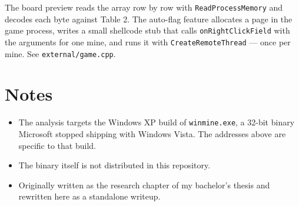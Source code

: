 \documentclass[11pt,a4paper]{article}
\begin{document}
The board preview reads the array row by row with \texttt{ReadProcessMemory} and decodes each
byte against Table 2. The auto-flag feature allocates a page in the game process, writes a small
shellcode stub that calls \texttt{onRightClickField} with the arguments for one mine, and runs
it with \texttt{CreateRemoteThread} --- once per mine. See \texttt{external/game.cpp}.


\section*{Notes}

\begin{itemize}
  \item The analysis targets the Windows XP build of \texttt{winmine.exe}, a 32-bit binary
        Microsoft stopped shipping with Windows Vista. The addresses above are specific to that
        build.
  \item The binary itself is not distributed in this repository.
  \item Originally written as the research chapter of my bachelor's thesis and rewritten here
        as a standalone writeup.
\end{itemize}
\end{document}
